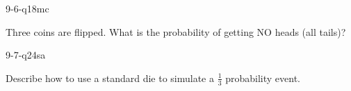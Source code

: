 \begin{practiceQuestion}{9-6-q18}{mc}
\begin{questionText}
Three coins are flipped. What is the probability of getting NO heads (all tails)?
\end{questionText}
\end{practiceQuestion}

\begin{practiceQuestion}{9-7-q24}{sa}
\begin{questionText}
Describe how to use a standard die to simulate a $\frac{1}{3}$ probability event.
\end{questionText}
\end{practiceQuestion}
